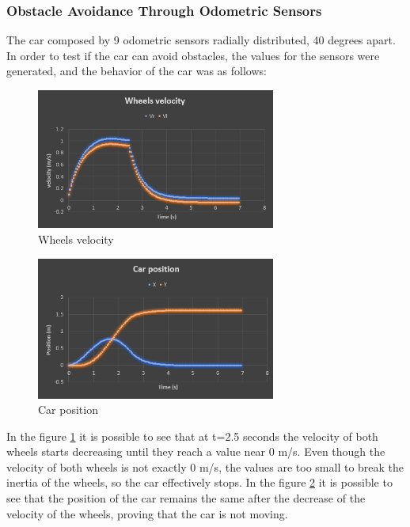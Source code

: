 \subsubsection{Obstacle Avoidance Through Odometric Sensors}
The car composed by 9 odometric sensors radially distributed, 40 degrees apart.\\
In order to test if the car can avoid obstacles, the values for the sensors were generated, and the behavior of the car was as follows:
\begin{figure}[!h]
\centering
\includegraphics[width=0.7\textwidth]{./img/testodovel.PNG}
\caption {\label{fig:test - odovel}Wheels velocity}
\end{figure}

\begin{figure}[!h]
\centering
\includegraphics[width=0.7\textwidth]{./img/testodoxy.PNG}
\caption {\label{fig:test - odoxy}Car position}
\end{figure}

In the figure \ref{fig:test - odovel} it is possible to see that at t=2.5 seconds the velocity of both wheels starts decreasing until they reach a value near 0 m/s. Even though the velocity of both wheels is not exactly 0 m/s, the values are too small to break the inertia of the wheels, so the car effectively stops.
In the figure \ref{fig:test - odoxy} it is possible to see that the position of the car remains the same after the decrease of the velocity of the wheels, proving that the car is not moving.